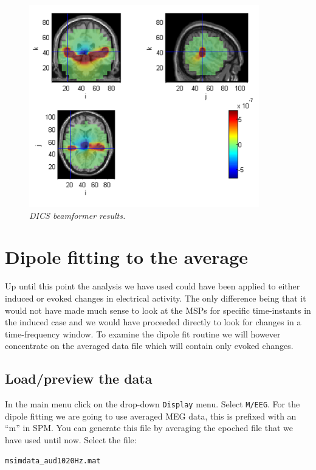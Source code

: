 \begin{figure}
\begin{center}
\includegraphics[width=100mm]{meg_sloc/slide13}
\caption{\em DICS beamformer results.\label{meg_sloc:fig:13}}
\end{center}
\end{figure}

\section{Dipole fitting to the average}

Up until this point the analysis we have used could have been applied to either induced or evoked changes in electrical activity. The only difference being that it would not have made much sense to look at the MSPs for specific time-instants in the induced case and we would have proceeded directly to look for changes in a time-frequency window. To examine the dipole fit routine we will however concentrate on the averaged data file which will contain only evoked changes.

\subsection{Load/preview the data}

In the main menu click on the drop-down \texttt{Display} menu. Select \texttt{M/EEG}. For the dipole fitting we are going to use averaged MEG data, this is prefixed with an ``m'' in SPM. You can generate this file by averaging the epoched file that we have used until now. Select the file:

\begin{verbatim}
msimdata_aud1020Hz.mat
\end{verbatim}

